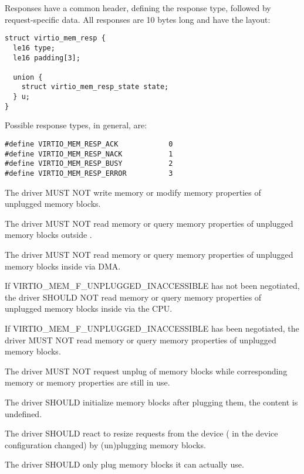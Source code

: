 Responses have a common header, defining the response type, followed by
request-specific data.  All responses are 10 bytes long and have the layout:

\begin{lstlisting}
struct virtio_mem_resp {
  le16 type;
  le16 padding[3];

  union {
    struct virtio_mem_resp_state state;
  } u;
}
\end{lstlisting}

Possible response types, in general, are:

\begin{lstlisting}
#define VIRTIO_MEM_RESP_ACK            0
#define VIRTIO_MEM_RESP_NACK           1
#define VIRTIO_MEM_RESP_BUSY           2
#define VIRTIO_MEM_RESP_ERROR          3
\end{lstlisting}


The driver MUST NOT write memory or modify memory properties of
unplugged memory blocks.

The driver MUST NOT read memory or query memory properties of unplugged memory
blocks outside .

The driver MUST NOT read memory or query memory properties of unplugged memory
blocks inside  via DMA.

If VIRTIO_MEM_F_UNPLUGGED_INACCESSIBLE has not been negotiated, the driver
SHOULD NOT read memory or query memory properties of unplugged memory blocks
inside  via the CPU.

If VIRTIO_MEM_F_UNPLUGGED_INACCESSIBLE has been negotiated, the driver
MUST NOT read memory or query memory properties of unplugged memory blocks.

The driver MUST NOT request unplug of memory blocks while corresponding memory
or memory properties are still in use.

The driver SHOULD initialize memory blocks after plugging them, the content
is undefined.

The driver SHOULD react to resize requests from the device
( in the device configuration changed) by
(un)plugging memory blocks.

The driver SHOULD only plug memory blocks it can actually use.

